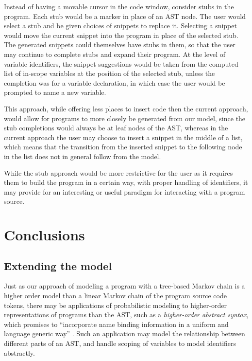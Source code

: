\documentclass{article}
\begin{document}
Instead of having a movable cursor in the code window, consider stubs in the
program. Each stub would be a marker in place of an AST node. The user would
select a stub and be given choices of snippets to replace it. Selecting a
snippet would move the current snippet into the program in place of the selected
stub.  The generated snippets could themselves have stubs in them, so that the
user may continue to complete stubs and expand their program.  At the level of
variable identifiers, the snippet suggestions would be taken from the computed
list of in-scope variables at the position of the selected stub, unless the
completion was for a variable declaration, in which case the user would be
prompted to name a new variable.

This approach, while offering less places to insert code then the current
approach, would allow for programs to more closely be generated from our model,
since the stub completions would always be at leaf nodes of the AST, whereas in
the current approach the user may choose to insert a snippet in the middle of a
list, which means that the transition from the inserted snippet to the following
node in the list does not in general follow from the model.

While the stub approach would be more restrictive for the user as it requires
them to build the program in a certain way, with proper handling of identifiers,
it may provide for an interesting or useful paradigm for interacting with a program
source.

\section{Conclusions}


\subsection{Extending the model}

Just as our approach of modeling a program with a tree-based Markov chain is a
higher order model than a linear Markov chain of the program source code tokens,
there may be applications of probabilistic modeling to higher-order
representations of programs than the AST, such as a \emph{higher-order abstract syntax}, which promises to ``incorporate name binding information in a uniform and language generic way'' \cite{hosa}. Such an application may model the relationship between different
parts of an AST, and handle scoping of variables to model identifiers
abstractly.
\end{document}

